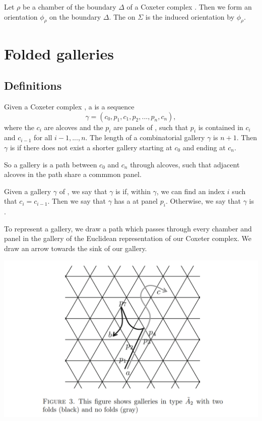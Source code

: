 \documentclass[11pt]{article}
\begin{document}
\begin{definition}
    Let $\rho$ be a chamber of the boundary $\Delta$ of a Coxeter complex \sg. Then we form an orientation $\phi_{\rho}$ on the boundary $\Delta$. The  on $\Sigma$ is the induced orientation by $\phi_{\rho}$. 
\end{definition}

\section{Folded galleries}

\subsection{Definitions}
\begin{definition}
    Given a Coxeter complex \sg, a  is a sequence
    \[\gamma = (c_0,p_1,c_1,p_2,...,p_n,c_n),\]
    where the $c_i$ are alcoves and the $p_i$ are panels of \sg, such that $p_i$ is contained in $c_i$ and $c_{i-1}$ for all $i-1,...,n$. The length of a combinatorial gallery $\gamma$ is $n+1$. Then $\gamma$ is  if there does not exist a shorter gallery starting at $c_0$ and ending at $c_n$. 
\end{definition}

So a gallery is a path between $c_0$ and $c_n$ through alcoves, such that adjacent alcoves in the path share a commmon panel. 

\begin{definition}
    Given a gallery $\gamma$ of \sg, we say that $\gamma$ is  if, within $\gamma$, we can find an index $i$ such that $c_i=c_{i-1}$. Then we say that $\gamma$ has a  at panel $p_i$. Otherwise, we say that $\gamma$ is .  
\end{definition}

To represent a gallery, we draw a path which passes through every chamber and panel in the gallery of the Euclidean representation of our Coxeter complex. We draw an arrow towards the sink of our gallery. 

\includegraphics[scale=0.6]{Screenshot 2023-02-03 111653.png}\\
\end{document}
